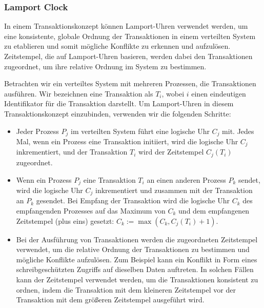 \documentclass[../vs-script-first-v01.tex]{subfiles}
\begin{document}
\subsubsection{Lamport Clock}
In einem Transaktionskonzept können Lamport-Uhren verwendet werden, um eine konsistente, globale Ordnung der Transaktionen in einem verteilten System zu etablieren und somit mögliche Konflikte zu erkennen und aufzulösen. Zeitstempel, die auf Lamport-Uhren basieren, werden dabei den Transaktionen zugeordnet, um ihre relative Ordnung im System zu bestimmen.

Betrachten wir ein verteiltes System mit mehreren Prozessen, die Transaktionen ausführen. Wir bezeichnen eine Transaktion als $T_i$, wobei $i$ einen eindeutigen Identifikator für die Transaktion darstellt. Um Lamport-Uhren in diesem Transaktionskonzept einzubinden, verwenden wir die folgenden Schritte:
\begin{itemize}
\item Jeder Prozess $P_j$ im verteilten System führt eine logische Uhr $C_j$ mit. Jedes Mal, wenn ein Prozess eine Transaktion initiiert, wird die logische Uhr $C_j$ inkrementiert, und der Transaktion $T_i$ wird der Zeitstempel $C_j(T_i)$ zugeordnet.

\item Wenn ein Prozess $P_j$ eine Transaktion $T_i$ an einen anderen Prozess $P_k$ sendet, wird die logische Uhr $C_j$ inkrementiert und zusammen mit der Transaktion an $P_k$ gesendet. Bei Empfang der Transaktion wird die logische Uhr $C_k$ des empfangenden Prozesses auf das Maximum von $C_k$ und dem empfangenen Zeitstempel (plus eins) gesetzt: $C_k := \max(C_k, C_j(T_i) + 1)$.

\item Bei der Ausführung von Transaktionen werden die zugeordneten Zeitstempel verwendet, um die relative Ordnung der Transaktionen zu bestimmen und mögliche Konflikte aufzulösen. Zum Beispiel kann ein Konflikt in Form eines schreibgeschützten Zugriffs auf dieselben Daten auftreten. In solchen Fällen kann der Zeitstempel verwendet werden, um die Transaktionen konsistent zu ordnen, indem die Transaktion mit dem kleineren Zeitstempel vor der Transaktion mit dem größeren Zeitstempel ausgeführt wird.
\end{itemize}
\end{document}
